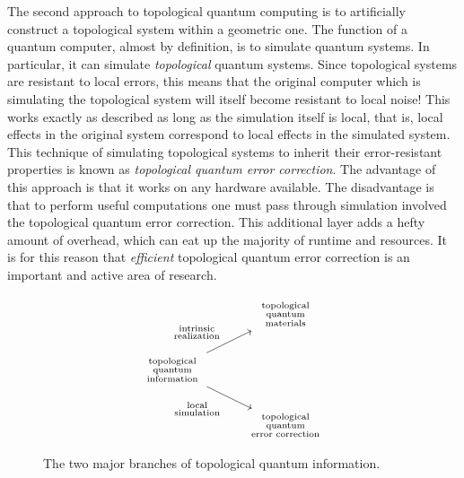 The second approach to topological quantum computing is to artificially construct a topological system within a geometric one. The function of a quantum computer, almost by definition, is to simulate quantum systems. In particular, it can simulate \textit{topological} quantum systems. Since topological systems are resistant to local errors, this means that the original computer which is simulating the topological system will itself become resistant to local noise! This works exactly as described as long as the simulation itself is local, that is, local effects in the original system correspond to local effects in the simulated system. This technique of simulating topological systems to inherit their error-resistant properties is known as \textit{topological quantum error correction}. The advantage of this approach is that it works on any hardware available. The disadvantage is that to perform useful computations one must pass through simulation involved the topological quantum error correction. This additional layer adds a hefty amount of overhead, which can eat up the majority of runtime and resources. It is for this reason that \textit{efficient} topological quantum error correction is an important and active area of research.

\begin{figure}
\[\begin{tikzcd}
	& \begin{array}{c} \substack{\text{topological}\\ \text{quantum}\\\text{materials}} \end{array} \\
	\begin{array}{c} \substack{\text{topological} \\ \text{quantum} \\ \text{information}} \end{array} \\
	& \begin{array}{c} \substack{\text{topological}\\\text{quantum}\\ \text{error correction}} \end{array}
	\arrow["\begin{array}{c} \substack{\text{intrinsic}\\\text{realization}} \end{array}", from=2-1, to=1-2]
	\arrow["\begin{array}{c} \substack{\text{local}\\\text{simulation}} \end{array}"', from=2-1, to=3-2]
\end{tikzcd}\]
\caption{The two major branches of topological quantum information.}
\end{figure}

